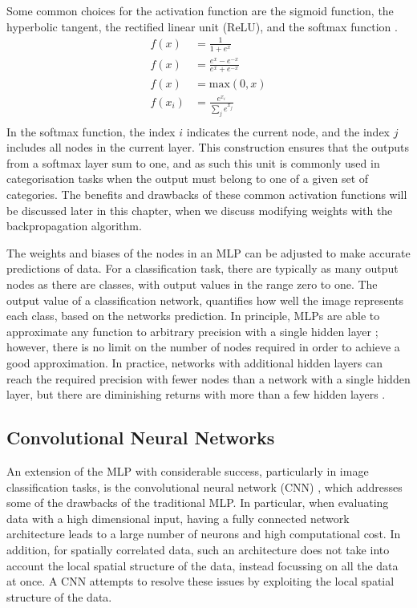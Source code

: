 Some common choices for the activation function are the sigmoid function, the
hyperbolic tangent, the rectified linear unit (ReLU), and the softmax function
\cite{Lecun2015, He2015, Szegedy2015}.
\begin{align}
	\tag{Sigmoid} f(x) &= \frac{1}{1+e^x} \\
	\tag{Tanh}    f(x) &= \frac{e^x - e^{-x}}{e^x+e^{-x}} \\
	\tag{ReLU}    f(x) &= \mbox{max}\left( 0, x \right) \\
	\tag{Softmax} f(x_i) &= \frac{e^{x_i}}{\displaystyle\sum_j e^{x_j}} \\
	\label{eqn:losses}
\end{align}
In the softmax function, the index $i$ indicates the current node, and the index
$j$ includes all nodes in the current layer. This construction ensures that 
the outputs from a softmax layer sum to one, and as such this unit is commonly 
used in categorisation tasks when the output must belong to one of a given set 
of categories. The benefits and drawbacks of these common activation functions 
will be discussed later in this chapter, when we discuss modifying weights 
with the backpropagation algorithm.

The weights and biases of the nodes in an MLP can be adjusted to make accurate 
predictions of data. For a classification task, there are typically as many
output nodes as there are classes, with output values in the range zero to one. 
The output value of a classification network, quantifies how well the image
represents each class, based on the networks prediction. In principle, MLPs 
are able to approximate any function to arbitrary precision with a 
single hidden layer \cite{Cybenko1989ApproximationBS}; however, there is no 
limit on the number of nodes required in order to achieve a good 
approximation. In practice, networks with additional hidden layers can reach 
the required precision with fewer nodes than a network with a single hidden 
layer, but there are diminishing returns with more than a few hidden layers 
\cite{Reed1999, Lecun2015}.

\subsection{Convolutional Neural Networks}
An extension of the MLP with considerable success, particularly in image 
classification tasks, is the convolutional neural network (CNN) 
\cite{Jackel2008, Szegedy2015, 5537907}, which addresses some of the drawbacks 
of the traditional MLP. In particular, when evaluating data with a high 
dimensional input, having a fully connected network architecture leads to a 
large number of neurons and high computational cost. In addition, for 
spatially correlated data, such an architecture does not take into account the 
local spatial structure of the data, instead focussing on all the data at 
once. A CNN attempts to resolve these issues by exploiting the local spatial 
structure of the data.

